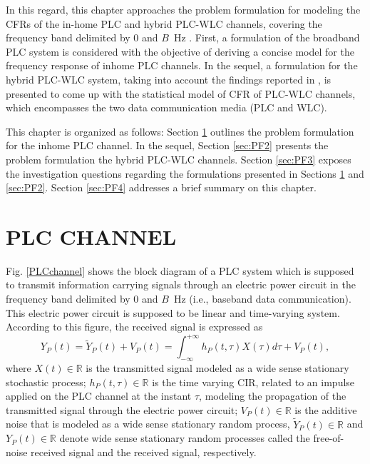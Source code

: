 In this regard, this chapter approaches the problem formulation for modeling the \acp{CFR} of the in-home \ac{PLC} and hybrid \ac{PLC}-\ac{WLC} channels, covering the frequency band delimited by $0$ and $B$~Hz . First, a formulation of the broadband \ac{PLC} system is considered with the objective of deriving a concise model for the frequency response of inhome \ac{PLC} channels. In the sequel, a formulation for the hybrid \ac{PLC}-\ac{WLC} system, taking into account the findings reported in \cite{thiago:hyb}, is presented to come up with the statistical model of \ac{CFR} of \ac{PLC}-\ac{WLC} channels, which encompasses the two data communication media (\ac{PLC} and \ac{WLC}).

This chapter is organized as follows: Section \ref{sec:PF1} outlines the problem formulation for the inhome \ac{PLC} channel. In the sequel, Section \ref{sec:PF2} presents the problem formulation the hybrid \ac{PLC}-\ac{WLC} channels. Section \ref{sec:PF3} exposes the investigation questions regarding the formulations presented in Sections \ref{sec:PF1} and \ref{sec:PF2}. Section \ref{sec:PF4} addresses a brief summary on this chapter.

\section{PLC CHANNEL} \label{sec:PF1}

Fig. \ref{PLCchannel} shows the block diagram of a \ac{PLC} system which is supposed to transmit information carrying signals through an electric power circuit in the frequency band delimited by $0$ and $B$~Hz (i.e., baseband data communication). This electric power circuit is supposed to be linear and time-varying system. According to this figure, the received signal is expressed as
\begin{equation} \label{received signal}
Y_P(t) = \tilde{Y}_P(t)+V_P(t) = \int_{-\infty}^{+\infty} h_P(t,\tau) X(\tau) d\tau + V_P(t),
\end{equation}
where $X(t)\in \mathbb{R}$ is the transmitted signal modeled as a wide sense stationary stochastic process; $h_P(t,\tau)\in \mathbb{R}$ is the time varying \ac{CIR}, related to an impulse applied on the \ac{PLC} channel at the instant $\tau$, modeling the propagation of the transmitted signal through the electric power circuit; $V_P(t)\in \mathbb{R}$ is the additive noise that is modeled as a wide sense stationary random process, $\tilde{Y}_P(t)\in \mathbb{R}$ and $Y_P(t)\in \mathbb{R}$ denote wide sense stationary random processes called the free-of-noise received signal and the received signal, respectively.

